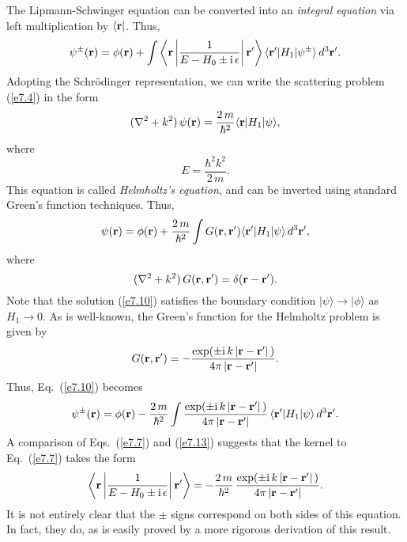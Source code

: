 The Lipmann-Schwinger equation can be converted into an {\em integral
equation} via left multiplication by $\langle{\bf r}|$. Thus,
\begin{equation}\label{e7.7}
\psi^\pm({\bf r}) = \phi({\bf r})
+\int \left\langle{\bf r}\left|\frac{1}{E-H_0\pm {\rm i}\,\epsilon}
\right| {\bf r}'\right\rangle \langle {\bf r}'|H_1|\psi^\pm\rangle\,d^3{\bf r}'.
\end{equation}
Adopting the Schr\"{o}dinger representation, we can write the scattering
problem (\ref{e7.4}) in the form
\begin{equation}
(\nabla^2 + k^2)\,\psi({\bf r}) = \frac{2\,m}{\hbar^2} \langle {\bf r} |H_1|
\psi\rangle,
\end{equation}
where
\begin{equation}
E = \frac{\hbar^2 k^2}{2\,m}.
\end{equation}
This equation is called {\em Helmholtz's equation}, and can be inverted
using standard Green's function techniques. Thus,
\begin{equation}\label{e7.10}
\psi({\bf r}) = \phi({\bf r}) + \frac{2\,m}{\hbar^2} \int G({\bf r}, {\bf r'})
\langle {\bf r}' |H_1|\psi\rangle \,d^3{\bf r}',
\end{equation}
where
\begin{equation}
(\nabla^2 + k^2)\,G({\bf r}, {\bf r}') = \delta({\bf r} -{\bf r}').
\end{equation}
Note that the solution (\ref{e7.10}) satisfies the boundary condition $|\psi\rangle
\rightarrow |\phi\rangle$ as $H_1\rightarrow 0$. 
As is well-known, the Green's function for the Helmholtz problem is
given by
\begin{equation}
G({\bf r}, {\bf r}') = -\frac{\exp(\pm {\rm i}\,k\,
|{\bf r} - {\bf r}'|\,)}{4\pi\,|{\bf r} - {\bf r}'|}.
\end{equation}
Thus, Eq.~(\ref{e7.10}) becomes
\begin{equation}
\psi^\pm({\bf r}) = \phi({\bf r}) - \frac{2\,m}{\hbar^2} \int\frac{\exp(\pm {\rm i}\,k\,
|{\bf r} - {\bf r}'|\,)}{4\pi\,|{\bf r} - {\bf r}'|}\, \langle {\bf r}' |H_1|\psi\rangle \,d^3{\bf r}'.\label{e7.13}
\end{equation}
A comparison of Eqs.~(\ref{e7.7}) and (\ref{e7.13}) suggests that the kernel to Eq.~(\ref{e7.7})
takes the form
\begin{equation}
 \left\langle{\bf r}\left|\frac{1}{E-H_0\pm {\rm i}\,\epsilon}
\right| {\bf r}'\right\rangle  = - \frac{2\,m}{\hbar^2} \,
\frac{\exp(\pm {\rm i}\,k\,
|{\bf r} - {\bf r}'|\,)}{4\pi\,|{\bf r} - {\bf r}'|}   .
\end{equation}
It is not entirely clear that the $\pm$ signs correspond on both sides
of this equation. In fact, they do, as is easily proved by a more rigorous
derivation of this result. 

